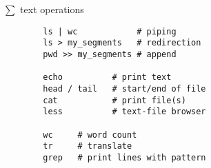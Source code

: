 \documentclass[xcolor=dvipsnames]{beamer}
\begin{document}
\begin{frame}[fragile]
	$\sum$ text operations
	\Large
	\begin{verbatim}
		ls | wc            # piping
		ls > my_segments   # redirection
		pwd >> my_segments # append

		echo          # print text
		head / tail   # start/end of file
		cat           # print file(s)
		less          # text-file browser

		wc     # word count
		tr     # translate
		grep   # print lines with pattern
	\end{verbatim}
\end{frame}
\end{document}
